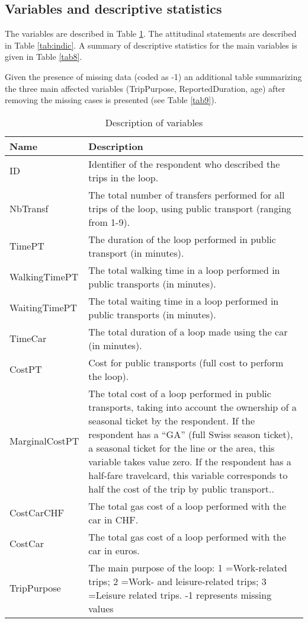 \documentclass[12pt,a4paper]{article}
\begin{document}
\subsection{Variables and descriptive statistics}

The variables are described in Table \ref{tab1}. The attitudinal statements are described in Table \ref{tab:indic}. A summary of descriptive statistics for the main variables is given in Table \ref{tab8}.


Given the presence of missing data (coded as -1) an additional table summarizing the three main affected variables (TripPurpose, ReportedDuration,	age) after removing the missing cases is presented (see Table \ref{tab9}).

\clearpage


\begin{longtable}{||p{4cm}|p{9cm}||}
\caption{\label{tab1} Description of variables}\\
\hline 
\hline 
\textbf{Name} & \textbf{Description}\\
\hline 
ID & Identifier of the respondent who described the trips in the loop.\tabularnewline
\hline 
NbTransf & The total number of transfers performed for all trips of the loop,
using public transport (ranging from 1-9).\tabularnewline
\hline 
TimePT & The duration of the loop performed in public transport (in minutes).\tabularnewline
\hline 
WalkingTimePT & The total walking time in a loop performed in public transports (in minutes).\tabularnewline
\hline 
WaitingTimePT & The total waiting time in a loop performed in public transports (in minutes).\tabularnewline
\hline 
TimeCar & The total duration of a loop made using the car (in minutes).\tabularnewline
\hline 
CostPT & Cost for public transports (full cost to perform the loop). \tabularnewline
\hline 
MarginalCostPT & The total cost of a loop performed in public transports, taking into account the ownership of a seasonal ticket by the respondent. If the respondent has a ``GA'' (full Swiss season ticket), a seasonal ticket for the line or the area, this variable takes value zero. If the respondent has a half-fare travelcard, this variable corresponds to half the cost of the trip by public transport..\tabularnewline
\hline 
CostCarCHF & The total gas cost of a loop performed with the car in CHF.\tabularnewline
\hline 
CostCar & The total gas cost of a loop performed with the car in euros.\tabularnewline
\hline 
TripPurpose & The main purpose of the loop: 1 =Work-related trips; 2 =Work- and leisure-related
trips; 3 =Leisure related trips. -1 represents missing values \tabularnewline

\end{longtable}
\end{document}
